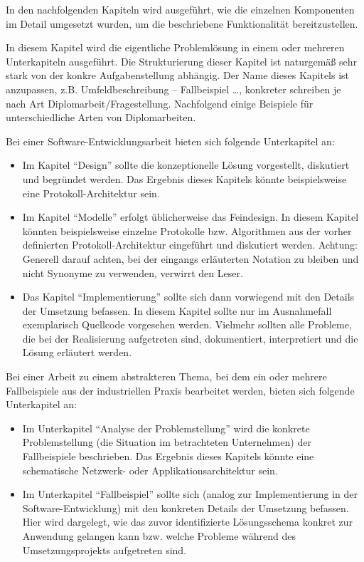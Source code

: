 In den nachfolgenden Kapiteln wird ausgeführt, wie die einzelnen Komponenten im Detail umgesetzt wurden, um die beschriebene Funktionalität bereitzustellen. 


In diesem Kapitel wird die eigentliche Problemlösung in einem oder mehreren Unterkapiteln ausgeführt. Die Strukturierung dieser Kapitel ist naturgemäß sehr stark von der konkre Aufgabenstellung abhängig. Der Name dieses Kapitels ist anzupassen, z.B. Umfeldbeschreibung -- Fallbeispiel \dots, konkreter schreiben je nach Art Diplomarbeit/Fragestellung.
\makeatletter\ifthesis@masterthesis
Nachfolgend einige Beispiele für unterschiedliche Arten von Diplomarbeiten.

Bei einer Software-Entwicklungsarbeit bieten sich folgende Unterkapitel an:
\begin{itemize}
	\item Im Kapitel \enquote{Design} sollte die konzeptionelle Lösung vorgestellt, diskutiert und begründet werden. Das Ergebnis dieses Kapitels könnte beispielsweise eine Protokoll-Architektur sein.
	\item Im Kapitel \enquote{Modelle} erfolgt üblicherweise das Feindesign. In diesem Kapitel könnten beispielsweise einzelne Protokolle bzw. Algorithmen aus der vorher definierten Protokoll-Architektur eingeführt und diskutiert werden. Achtung: Generell darauf achten, bei der eingangs erläuterten Notation zu bleiben und nicht Synonyme zu verwenden, verwirrt den Leser.
	\item Das Kapitel \enquote{Implementierung} sollte sich dann vorwiegend mit den Details der Umsetzung befassen. In diesem Kapitel sollte nur im Ausnahmefall exemplarisch Quellcode vorgesehen werden. Vielmehr sollten alle Probleme, die bei der Realisierung aufgetreten sind, dokumentiert, interpretiert und die Lösung erläutert werden.
\end{itemize}

Bei einer Arbeit zu einem abstrakteren Thema, bei dem ein oder mehrere Fallbeispiele aus der industriellen Praxis bearbeitet werden, bieten sich folgende Unterkapitel an:
\begin{itemize}
	\item Im Unterkapitel \enquote{Analyse der Problemstellung} wird die konkrete Problemstellung (die Situation im betrachteten Unternehmen) der Fallbeispiele beschrieben. Das Ergebnis dieses Kapitels könnte eine schematische Netzwerk- oder Applikationsarchitektur sein.
	\item Im Unterkapitel \enquote{Fallbeispiel} sollte sich (analog zur Implementierung in der Software-Entwicklung) mit den konkreten Details der Umsetzung befassen. Hier wird dargelegt, wie das zuvor identifizierte Lösungsschema konkret zur Anwendung gelangen kann bzw. welche Probleme während des Umsetzungsprojekts aufgetreten sind.
\end{itemize}

